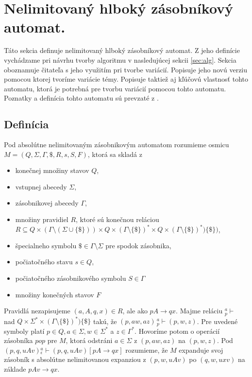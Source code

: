 \section{Nelimitovaný hlboký zásobníkový automat.}
Táto sekcia definuje nelimitovaný hlboký zásobníkový automat. Z jeho definície vychádzame pri návrhu tvorby algoritmu v nasledujúcej sekcii \ref{sec:alg}. Sekcia oboznamuje čitateľa s jeho využitím pri tvorbe variácií. Popisuje jeho novú verziu pomocou ktorej tvoríme variácie témy. Popisuje taktiež aj kľúčovú vlastnosť tohto automatu, ktorá je potrebná pre tvorbu variácií pomocou tohto automatu. Poznatky a definícia tohto automatu sú prevzaté z \cite{FITPUB10978}.

\subsection{Definícia}
\begin{definition}
Pod absolútne nelimitovaným zásobnikovým automatom rozumieme osmicu $M = (Q, \Sigma, \Gamma, \$, R, s, S, F)$, ktorá sa skladá z
\begin{itemize}\itemsep0.05em
\item konečnej množiny stavov $Q$,
\item vstupnej abecedy $\Sigma$,
\item zásobnikovej abecedy $\Gamma$,
\item množiny pravidiel $R$, ktoré sú konečnou reláciou $R \subseteq Q \times (\Gamma \setminus (\Sigma \cup \{\$\})) \times Q \times (\Gamma \setminus \{\$\})^* \times Q \times (\Gamma \setminus \{\$\})^*)\{\$\})$,
\item špecialneho symbolu $\$ \in \Gamma \setminus \Sigma$ pre spodok zásobnika,
\item počiatočného stavu $s \in Q$,
\item počiatočného zásobnikového symbolu $S \in \Gamma$
\item množiny konečných stavov $F$
\end{itemize}
\end{definition}

Pravidlá nezapisujeme $(a, A, q, x) \in R$, ale ako $pA \rightarrow qx$. Majme reláciu ${}^a_p\vdash$ nad $Q \times \Sigma^* \times (\Gamma \setminus \{\$\})^*)\{\$\}$ takú, že $(p, aw, az) \, {}^a_p\vdash (p, w, z)$. Pre uvedené symboly platí $p \in Q, a \in \Sigma, w \in \Sigma^*$ a $z \in \Gamma^*$. Hovoríme potom o operácií zásobníka $pop$ pre $M$, ktorá odstráni $a \in \Sigma$ z $(p, aw, az)$ na $(p, w, z)$. Pod $(p, q, uAv) {}^a_\epsilon \vdash (p, q, uAv)[pA \rightarrow qx]$ rozumieme, že $M$ expanduje svoj zásobník s absolútne nelimitovanou expanziou z $(p, w, uAv)$ po $(q, w, uxv)$ na základe $pAv \rightarrow qx$.

